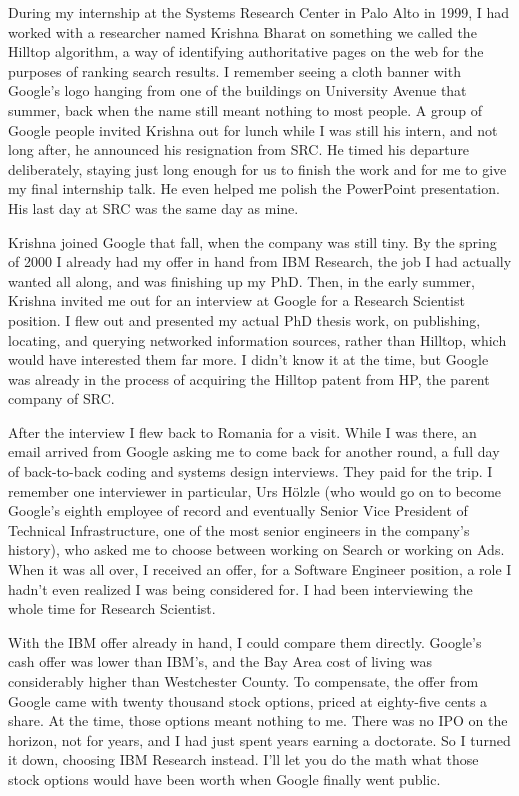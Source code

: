 \documentclass[12pt]{book}
\begin{document}
During my internship at the Systems Research Center in Palo Alto in
1999, I had worked with a researcher named Krishna Bharat on something
we called the Hilltop algorithm, a way of identifying authoritative
pages on the web for the purposes of ranking search results. I remember
seeing a cloth banner with Google's logo hanging from one of the
buildings on University Avenue that summer, back when the name still
meant nothing to most people. A group of Google people invited Krishna
out for lunch while I was still his intern, and not long after, he
announced his resignation from SRC. He timed his departure deliberately,
staying just long enough for us to finish the work and for me to give my
final internship talk. He even helped me polish the PowerPoint
presentation. His last day at SRC was the same day as mine.

Krishna joined Google that fall, when the company was still tiny. By the
spring of 2000 I already had my offer in hand from IBM Research, the job
I had actually wanted all along, and was finishing up my PhD. Then, in
the early summer, Krishna invited me out for an interview at Google for
a Research Scientist position. I flew out and presented my actual PhD
thesis work, on publishing, locating, and querying networked information
sources, rather than Hilltop, which would have interested them far more.
I didn't know it at the time, but Google was already in the process of
acquiring the Hilltop patent from HP, the parent company of SRC.

After the interview I flew back to Romania for a visit. While I was
there, an email arrived from Google asking me to come back for another
round, a full day of back-to-back coding and systems design interviews.
They paid for the trip. I remember one interviewer in particular, Urs
Hölzle (who would go on to become Google's eighth employee of record and
eventually Senior Vice President of Technical Infrastructure, one of the
most senior engineers in the company's history), who asked me to choose
between working on Search or working on Ads. When it was all over, I
received an offer, for a Software Engineer position, a role I hadn't
even realized I was being considered for. I had been interviewing the
whole time for Research Scientist.

With the IBM offer already in hand, I could compare them directly.
Google's cash offer was lower than IBM's, and the Bay Area cost of
living was considerably higher than Westchester County. To compensate,
the offer from Google came with twenty thousand stock options, priced at
eighty-five cents a share. At the time, those options meant nothing to
me. There was no IPO on the horizon, not for years, and I had just spent
years earning a doctorate. So I turned it down, choosing IBM Research
instead. I'll let you do the math what those stock options would have
been worth when Google finally went public.
\end{document}
